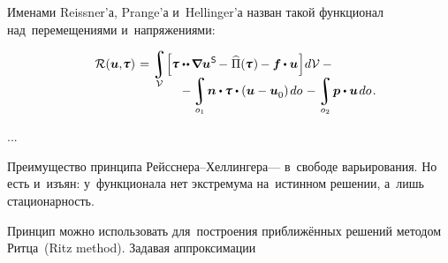 \begin{otherlanguage}{russian}

\noindent
Именами Reissner’а, Prange’а и~Hellinger’а назван такой функционал над~перемещениями и~напряжениями:

\nopagebreak\vspace{-0.25em}\begin{multline}\label{reissnerhellingervariationalprinciple}
\shoveleft{\displaystyle \mathcal{R}(\bm{u}, \hspace{-0.32ex}\mathboldtau) \hspace{0.2ex} =
\integral\displaylimits_{\mathcal{V}} \hspace{-0.4ex}
\left[^{\mathstrut} \hspace{-0.2ex}
\mathboldtau \dotdotp \hspace{-0.16ex} \boldnabla {\bm{u}}^{\hspace{0.08ex}\mathsf{S}} \hspace{-0.2ex} - \hspace{0.1ex} \widehat{\Pi}(\hspace{-0.1ex}\mathboldtau\hspace{.1ex})\hspace{-0.1ex} -
\bm{f} \hspace{-0.1ex} \dotp \bm{u}
\hspace{0.1ex} \right] \hspace{-0.32ex} d\mathcal{V} \hspace{.5ex} - \hfill} \\[-1.2em]
%
\hspace{8em} \displaystyle - \integral\displaylimits_{o_1} \hspace{-0.25ex} \bm{n} \dotp \hspace{-0.1ex} \mathboldtau \dotp \left( \bm{u} - \bm{u}_{\raisemath{-0.1em}{0}} \right) \hspace{-0.1ex} do \hspace{.2ex} -
\integral\displaylimits_{o_2} \hspace{-0.2ex} \bm{p} \dotp \bm{u} \hspace{0.25ex} do \hspace{0.2ex}.
\end{multline}


...


Преимущество принципа Рейсснера\hbox{--}Хеллингера\:--- в~свободе варьирования. Но есть и~изъян: у~функционала нет экстремума на~истинном решении, а~лишь стационарность.

Принцип можно использовать для~построения приближённых решений методом Ритца~(Ritz method). Задавая аппроксимации



\end{otherlanguage}
